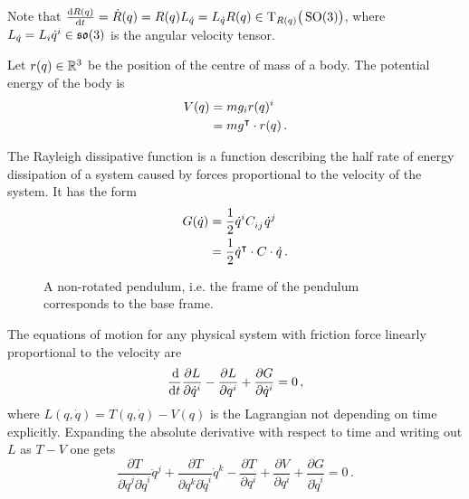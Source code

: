 \begin{rem}
    Note that $\frac{\operatorname{d\!} R(q)}{\operatorname{d\!} t} = \dot{R}(q) = R(q) L_{\dot{q}} = L_{\dot{q}} R(q) \in \mathrm{T}_{R(q)}\big(\operatorname{SO}(3)\big)$, where $L_{\dot{q}} = L_i \dot{q}^i \in \mathfrak{so}(3)$ is the angular velocity tensor.
\end{rem}

\begin{lem}\label{lem_potential_energy}
    Let $r(q) \in \mathbb{R}^3$ be the position of the centre of mass of a body. The potential energy of the body is
    \begin{align*}
        V(q) &= m g_i r(q)^i \\
             &= m g^\intercal \cdot r(q) \,.
    \end{align*}
\end{lem}

\begin{defn}\label{def_dissipation_function}
    The Rayleigh dissipative function is a function describing the half rate of energy dissipation of a system caused by forces proportional to the velocity of the system. It has the form
    \begin{align*}
        G(\dot{q}) &= \frac{1}{2} \dot{q}^i C\indices{_i_j} \dot{q}^j \\
                   &= \frac{1}{2} \dot{q}^\transpose \cdot C \cdot \dot{q} \,.
    \end{align*}
\end{defn}


\begin{figure}
    \begin{center}
        
        \caption{A non-rotated pendulum, i.e. the frame of the pendulum corresponds to the base frame.}
    \end{center}
\end{figure}

The equations of motion for any physical system with friction force linearly proportional to the velocity are
\begin{equation*}
    \frac{\operatorname{d\!}}{\operatorname{d\!} t} \frac{\partial L}{\partial \dot{q}^i} - \frac{\partial L}{\partial q^i} + \frac{\partial G}{\partial \dot{q}^i} = 0 \,,
\end{equation*}
where $L(q, \dot{q}) = T(q, \dot{q}) - V(q)$ is the Lagrangian not depending on time explicitly. Expanding the absolute derivative with respect to time and writing out $L$ as $T - V$ one gets
\begin{equation*}
     \frac{\partial T}{\partial \dot{q}^j \partial \dot{q}^i} \ddot{q}^j
    +\frac{\partial T}{\partial q^k \partial \dot{q}^i} \dot{q}^k
    -\frac{\partial T}{\partial q^i}
    +\frac{\partial V}{\partial q^i}
    +\frac{\partial G}{\partial \dot{q}^i} = 0 \,.
\end{equation*}

